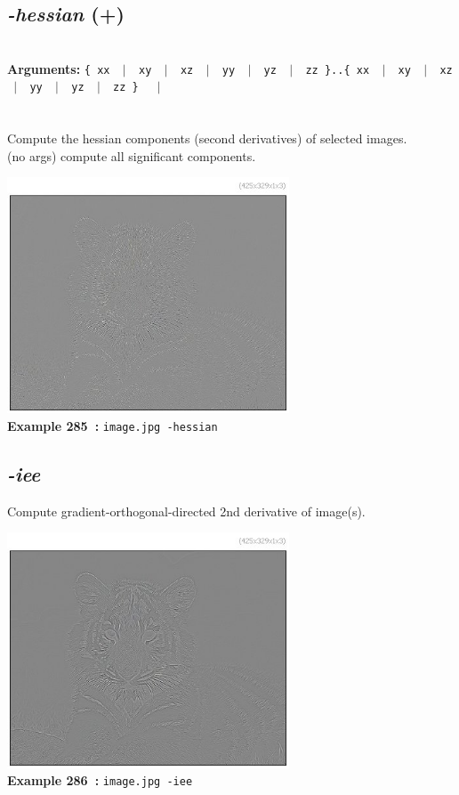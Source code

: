 \documentclass[a4paper,11pt,twoside]{book}
\begin{document}
\subsection{\emph{-hessian} (+)}\vspace*{-0.5em}
~\\\textbf{Arguments: } 
{\small \texttt{\{ xx ~$|$~ xy ~$|$~ xz ~$|$~ yy ~$|$~ yz ~$|$~ zz \}..\{ xx ~$|$~ xy ~$|$~ xz ~$|$~ yy ~$|$~ yz ~$|$~ zz \}}}~~~$|$\\
\\~\\
Compute the hessian components (second derivatives) of selected images.
~\\(no args) compute all significant components.
\begin{center}\includegraphics[keepaspectratio=true,height=7cm,width=\textwidth]{img/gmic_def285.jpg}\\
{\footnotesize \textbf{Example 285~:} \texttt{image.jpg -hessian}}
\end{center}

\subsection{\emph{-iee} }\vspace*{-0.5em}
Compute gradient-orthogonal-directed 2nd derivative of image(s).
\begin{center}\includegraphics[keepaspectratio=true,height=7cm,width=\textwidth]{img/gmic_def286.jpg}\\
{\footnotesize \textbf{Example 286~:} \texttt{image.jpg -iee}}
\end{center}
\end{document}
